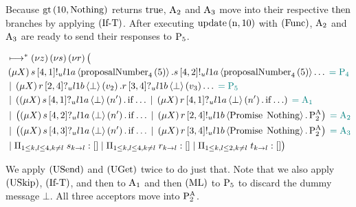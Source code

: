 Because $\operatorname{gt}\left(10, \operatorname{Nothing}\right)$ returns $\operatorname{true}$, $\operatorname{A_{2}}$ and $\operatorname{A_{3}}$ move into their respective $\Then$ branches by applying $\left(\operatorname{If-T}\right)$.
After executing $\operatorname{update} \left(\operatorname{n}, 10\right)$ with $\left(\operatorname{Func}\right)$, $\operatorname{A_{2}}$ and $\operatorname{A_{3}}$ are ready to send their responses to $\operatorname{P_{5}}$.

\begin{align*}
&\mapstostar \NuChannels \big (\\
&\Mu{\RecursionVariable} \SendUnreliableP{s}{4}{1}{\LOneA}{\proposalNumber{5}{4}}.\SendUnreliableP{s}{4}{2}{\LOneA}{\proposalNumber{5}{4}}\dots \comment{= \Proposer{4}}\\
&\Or \Mu{\RecursionVariable} \ReceiveUnreliableP{r}{2}{4}{\LOneB}{\bot}{v_2}.\ReceiveUnreliableP{r}{3}{4}{\LOneB}{\bot}{v_3}\dots \comment{= \Proposer{5}}\\
&\Or \Paren{
    \Mu{\RecursionVariable} \ReceiveUnreliableP{s}{4}{1}{\LOneA}{\bot}{n'}.\If{\dots}
    \Or \Mu{\RecursionVariable} \ReceiveUnreliableP{r}{4}{1}{\LOneA}{\bot}{n'}.\If{\dots}
} \comment{= \Acceptor{1}}\\
&\Or \Paren{
    \Mu{\RecursionVariable} \ReceiveUnreliableP{s}{4}{2}{\LOneA}{\bot}{n'}.\If{\dots}
    \Or \Mu{\RecursionVariable} \SendUnreliableP{r}{2}{4}{\LOneB}{\Promise{\Nothing}}.\PaTwo
} \comment{= \Acceptor{2}}\\
&\Or \Paren{
    \Mu{\RecursionVariable} \ReceiveUnreliableP{s}{4}{3}{\LOneA}{\bot}{n'}.\If{\dots}
    \Or \Mu{\RecursionVariable} \SendUnreliableP{r}{3}{4}{\LOneB}{\Promise{\Nothing}}.\PaTwo
} \comment{= \Acceptor{3}}\\
&\Or \InnerSessionQueues{s}
\Or \InnerSessionQueues{r}
\Or \OuterSessionQueues
\big )
\end{align*}

We apply $\left(\operatorname{USend}\right)$ and $\left(\operatorname{UGet}\right)$ twice to do just that.
Note that we also apply $\left(\operatorname{USkip}\right)$, $\left(\operatorname{If-T}\right)$, and then \RUsend to $\operatorname{A_{1}}$ and then $\left(\operatorname{ML}\right)$ to $\operatorname{P_{5}}$ to discard the dummy message $\bot$.
All three acceptors move into $\operatorname{P^{A}_{2}}$.

